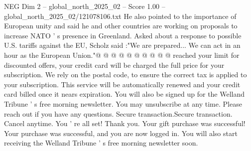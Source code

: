 \begin{textsample}{NEG Dim 2 – global\_north\_2025\_02 – Score 1.00 – global\_north\_2025\_02/121078106.txt}
He also pointed to the importance of European unity and said he and other countries are working on proposals to increase NATO ' s presence in Greenland.
Asked about a response to possible U.S. tariffs against the EU, Scholz said :"We are prepared...
We can act in an hour as the European Union."@ @ @ @ @ @ @ @ @ @ reached your limit for discounted offers, your credit card will be charged the full price for your subscription.
We rely on the postal code, to ensure the correct tax is applied to your subscription.
This service will be automatically renewed and your credit card billed once it nears expiration.
You will also be signed up for the Welland Tribune ' s free morning newsletter.
You may unsubscribe at any time.
Please reach out if you have any questions.
Secure transaction.Secure transaction.
Cancel anytime.
You ' re all set!
Thank you.
Your gift purchase was successful!
Your purchase was successful, and you are now logged in.
You will also start receiving the Welland Tribune ' s free morning newsletter soon.

\end{textsample}
